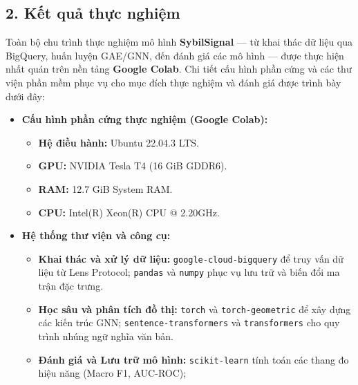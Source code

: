 \subsection{2. Kết quả thực nghiệm}

\indent\indent Toàn bộ chu trình thực nghiệm mô hình \textbf{SybilSignal} — từ khai thác dữ liệu qua BigQuery, huấn luyện GAE/GNN, đến đánh giá các mô hình — được thực hiện nhất quán trên nền tảng \textbf{Google Colab}. Chi tiết cấu hình phần cứng và các thư viện phần mềm phục vụ cho mục đích thực nghiệm và đánh giá được trình bày dưới đây:

\begin{itemize}[label={--}, itemsep=1pt]
    \item \textbf{Cấu hình phần cứng thực nghiệm (Google Colab):}
    \begin{itemize}[label={+}, itemsep=1pt]
        \item \textbf{Hệ điều hành:} Ubuntu 22.04.3 LTS.
        \item \textbf{GPU:} NVIDIA Tesla T4 (16 GiB GDDR6).
        \item \textbf{RAM:} 12.7 GiB System RAM.
        \item \textbf{CPU:} Intel(R) Xeon(R) CPU @ 2.20GHz.
    \end{itemize}
    
    \item \textbf{Hệ thống thư viện và công cụ:}
    \begin{itemize}[label={+}, itemsep=1pt]
        \item \textbf{Khai thác và xử lý dữ liệu:} \texttt{google-cloud-bigquery} để truy vấn dữ liệu từ Lens Protocol; \texttt{pandas} và \texttt{numpy} phục vụ lưu trữ và biến đổi ma trận đặc trưng.
        \item \textbf{Học sâu và phân tích đồ thị:} \texttt{torch} và \texttt{torch-geometric} để xây dựng các kiến trúc GNN; \texttt{sentence-transformers} và \texttt{transformers} cho quy trình nhúng ngữ nghĩa văn bản.
        \item \textbf{Đánh giá và Lưu trữ mô hình:} \texttt{scikit-learn} tính toán các thang đo hiệu năng (Macro F1, AUC-ROC);
    \end{itemize}
\end{itemize}







